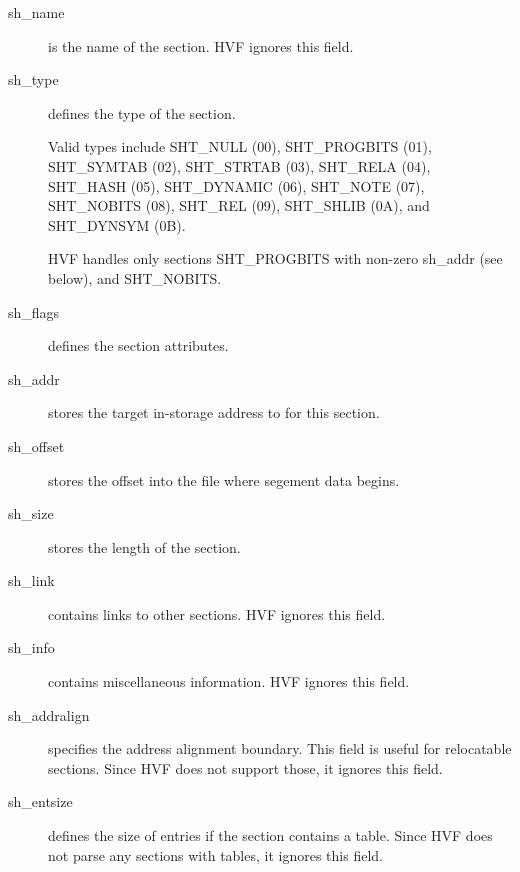 \begin{description}
\item[sh\_name] is the name of the section.  HVF ignores this field.

\item[sh\_type] defines the type of the section.

	Valid types include SHT\_NULL (00), SHT\_PROGBITS (01), SHT\_SYMTAB
	(02), SHT\_STRTAB (03), SHT\_RELA (04), SHT\_HASH (05), SHT\_DYNAMIC
	(06), SHT\_NOTE (07), SHT\_NOBITS (08), SHT\_REL (09), SHT\_SHLIB
	(0A), and SHT\_DYNSYM (0B).

	HVF handles only sections SHT\_PROGBITS with non-zero sh\_addr (see
	below), and SHT\_NOBITS.

\item[sh\_flags] defines the section attributes.

\item[sh\_addr] stores the target in-storage address to for this section.

\item[sh\_offset] stores the offset into the file where segement data
	begins.

\item[sh\_size] stores the length of the section.

\item[sh\_link] contains links to other sections.  HVF ignores this field.

\item[sh\_info] contains miscellaneous information.  HVF ignores this field.

\item[sh\_addralign] specifies the address alignment boundary.  This field
	is useful for relocatable sections.  Since HVF does not support
	those, it ignores this field.

\item[sh\_entsize] defines the size of entries if the section contains a
	table.  Since HVF does not parse any sections with tables, it
	ignores this field.

\end{description}
\cbend
